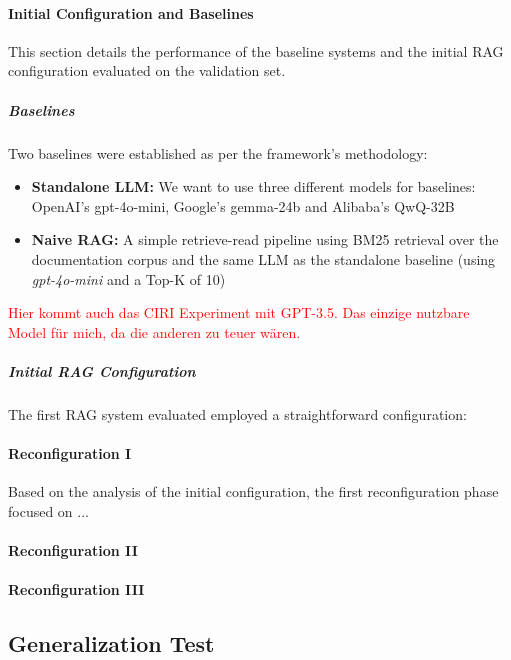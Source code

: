\paragraph{Initial Configuration and Baselines} \label{sec:exp_initial_config}
This section details the performance of the baseline systems and the initial RAG configuration evaluated on the validation set. 

\subparagraph{Baselines}
Two baselines were established as per the framework's methodology:
\begin{itemize}
    \item \textbf{Standalone LLM:} We want to use three different models for baselines: OpenAI's gpt-4o-mini\cite{OpenAI_2022}, Google's gemma-24b \cite{Gemma3.25.03.2025} and Alibaba's QwQ-32B\cite{qwq32b,qwen2.5}
    \item \textbf{Naive RAG:} A simple retrieve-read pipeline using BM25 retrieval over the documentation corpus and the same LLM as the standalone baseline (using \textit{gpt-4o-mini} and a Top-K of 10)
\end{itemize}

\textcolor{red}{Hier kommt auch das CIRI Experiment mit GPT-3.5. Das einzige nutzbare Model für mich, da die anderen zu teuer wären.}

\subparagraph{Initial RAG Configuration} %
The first RAG system evaluated employed a straightforward configuration:


\paragraph{Reconfiguration I} \label{sec:exp_reconfig_1}
Based on the analysis of the initial configuration, the first reconfiguration phase focused on ...


\paragraph{Reconfiguration II} \label{sec:exp_reconfig_2}


\paragraph{Reconfiguration III} \label{sec:exp_reconfig_3}

\subsection{Generalization Test} \label{sec:exp_generalization}

